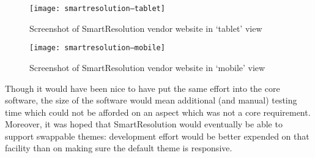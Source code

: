 \begin{figure}[h!]
  \centering
    \ifimages
    \texttt{[image: smartresolution--tablet]}
    \fi
  \caption{Screenshot of SmartResolution vendor website in `tablet' view}
  \label{screenshot:smartresolutionOrg:tablet}
\end{figure}

\begin{figure}[h!]
  \centering
    \ifimages
    \texttt{[image: smartresolution--mobile]}
    \fi
  \caption{Screenshot of SmartResolution vendor website in `mobile' view}
  \label{screenshot:smartresolutionOrg:mobile}
\end{figure}

Though it would have been nice to have put the same effort into the core software, the size of the software would mean additional (and manual) testing time which could not be afforded on an aspect which was not a core requirement. Moreover, it was hoped that SmartResolution would eventually be able to support swappable themes: development effort would be better expended on that facility than on making sure the default theme is responsive.